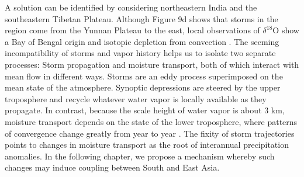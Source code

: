 	 A solution can be identified by considering northeastern India and the southeastern Tibetan Plateau. Although Figure 9d shows that storms in the region come from the Yunnan Plateau to the east, local observations of $\delta^{18}$O show a Bay of Bengal origin and isotopic depletion from convection \parencite{Gao2011}. The seeming incompatibility of storms and vapor history helps us to isolate two separate processes: Storm propagation and moisture transport, both of which interact with mean flow in different ways. Storms are an eddy process superimposed on the mean state of the atmosphere. Synoptic depressions are steered by the upper troposphere and recycle whatever water vapor is locally available as they propagate. In contrast, because the scale height of water vapor is about 3 km, moisture transport depends on the state of the lower troposphere, where patterns of convergence change greatly from year to year \parencite{Annamalai2001,Yoon2005}. The fixity of storm trajectories points to changes in moisture transport as the root of interannual precipitation anomalies. In the following chapter, we propose a mechanism whereby such changes may induce coupling between South and East Asia.
